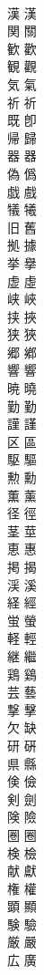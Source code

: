 \documentclass[8pt]{extreport}
\begin{document}
\begin{CJK}{UTF8}{min}
\\	漢	漢
\\	関	關
\\	歓	歡
\\	観	觀
\\	気	氣
\\	祈	祈
\\	既	卽
\\	帰	歸
\\	器	器
\\	偽	僞
\\	戯	戲
\\	犠	犧
\\	旧	舊
\\	拠	據
\\	挙	擧
\\	虚	虛
\\	峡	峽
\\	挟	挾
\\	狭	狹
\\	郷	鄕
\\	響	響
\\	暁	曉
\\	勤	勤
\\	謹	謹
\\	区	區
\\	駆	驅
\\	勲	勳
\\	薫	薰
\\	径	徑
\\	茎	莖
\\	恵	惠
\\	掲	揭
\\	渓	溪
\\	経	經
\\	蛍	螢
\\	軽	輕
\\	継	繼
\\	鶏	鷄
\\	芸	藝
\\	撃	擊
\\	欠	缺
\\	研	硏
\\	県	縣
\\	倹	儉
\\	剣	劍
\\	険	險
\\	圏	圈
\\	検	檢
\\	献	獻
\\	権	權
\\	顕	顯
\\	験	驗
\\	厳	嚴
\\	広	廣

\end{CJK}
\end{document}
